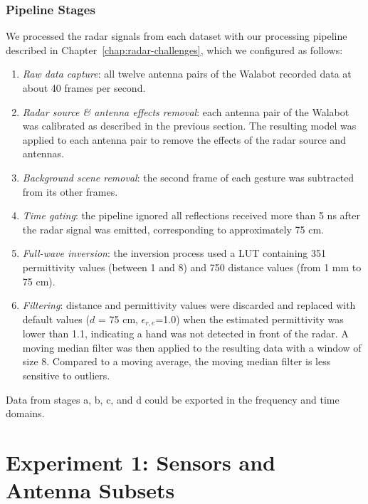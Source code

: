 \subsubsection{Pipeline Stages}
We processed the radar signals from each dataset with our processing pipeline described in Chapter~\ref{chap:radar-challenges}, which we configured as follows: 
\begin{enumerate}[label=(\alph*)]
    \item \textit{Raw data capture}: all twelve antenna pairs of the Walabot recorded data at about 40 frames per second.
    \item \textit{Radar source \& antenna effects removal}: each antenna pair of the Walabot was calibrated as described in the previous section. The resulting model was applied to each antenna pair to remove the effects of the radar source and antennas.
    \item \textit{Background scene removal}: the second frame of each gesture was subtracted from its other frames.
    \item \textit{Time gating}: the pipeline ignored all reflections received more than 5 ns after the radar signal was emitted, corresponding to approximately 75 cm.
    \item \textit{Full-wave inversion}: the inversion process used a LUT containing 351 permittivity values (between 1 and 8) and 750 distance values (from 1 mm to 75 cm).
    \item \textit{Filtering}: distance and permittivity values were discarded and replaced with default values ($d$ = 75 cm, $\epsilon_{r,e}$=1.0) when the estimated permittivity was lower than 1.1, indicating a hand was not detected in front of the radar. A moving median filter was then applied to the resulting data with a window of size 8. Compared to a moving average, the moving median filter is less sensitive to outliers.
\end{enumerate}
Data from stages a, b, c, and d could be exported in the frequency and time domains.


\section{Experiment 1: Sensors and Antenna Subsets} \label{sec:radar-experiments:sensors}
